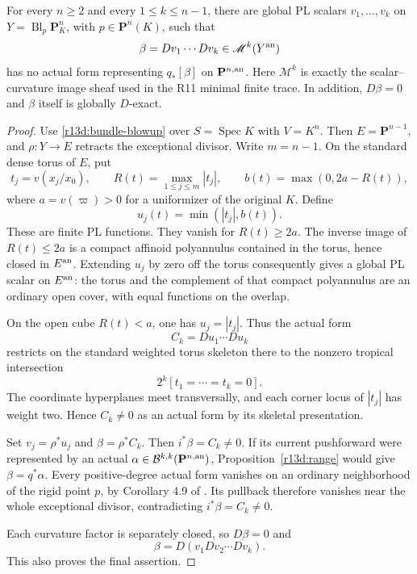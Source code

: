 \begin{theorem}
\label{r13d:counterexample}
For every $n\geq2$ and every $1\leq k\leq n-1$, there are global
PL scalars $v_1,\ldots,v_k$ on
$Y=\operatorname{Bl}_{p}\mathbf P^n_K$, with $p\in\mathbf P^n(K)$,
such that
\[
                      \beta=Dv_1\cdots Dv_k
                           \in\mathscr M^k(Y^{\rm an})
\]
has no actual form representing $q_*[\beta]$ on $\mathbf P^{n,\rm an}$.
Here $\mathscr M^k$ is exactly the scalar--curvature image sheaf
used in the R11 minimal finite trace.  In addition, $D\beta=0$ and
$\beta$ itself is globally $D$-exact.
\end{theorem}

\begin{proof}
Use \eqref{r13d:bundle-blowup} over $S=\operatorname{Spec}K$ with
$V=K^n$.  Then $E=\mathbf P^{n-1}$, and
$\rho:Y\to E$ retracts the exceptional divisor.  Write $m=n-1$.
On the standard dense torus of $E$, put
\[
 t_j=v(x_j/x_0),\qquad R(t)=\max_{1\leq j\leq m}|t_j|,
 \qquad b(t)=\max(0,2a-R(t)),
\]
where $a=v(\varpi)>0$ for a uniformizer of the original $K$.  Define
\[
                        u_j(t)=\min(|t_j|,b(t)).
\tag{R13.D13}\label{r13d:toric-potentials}
\]
These are finite PL functions.  They vanish for $R(t)\geq2a$.
The inverse image of $R(t)\leq2a$ is a compact affinoid polyannulus
contained in the torus, hence closed in $E^{\rm an}$.  Extending
$u_j$ by zero off the torus consequently gives a global PL scalar
on $E^{\rm an}$: the torus and the complement of that compact
polyannulus are an ordinary open cover, with equal functions on
the overlap.

On the open cube $R(t)<a$, one has $u_j=|t_j|$.  Thus the actual
form
\[
                              C_k=Du_1\cdots Du_k
\]
restricts on the standard weighted torus skeleton there to the
nonzero tropical intersection
\[
                         2^k[t_1=\cdots=t_k=0].
\]
The coordinate hyperplanes meet transversally, and each corner
locus of $|t_j|$ has weight two.  Hence $C_k\ne0$ as an actual
form by its skeletal presentation.

Set $v_j=\rho^*u_j$ and $\beta=\rho^*C_k$.
Then $i^*\beta=C_k\ne0$.  If its current pushforward were
represented by an actual $\alpha\in\mathcal B^{k,k}(\mathbf P^{n,\rm an})$,
Proposition~\ref{r13d:range} would give $\beta=q^*\alpha$.
Every positive-degree actual form vanishes on an ordinary
neighborhood of the rigid point $p$, by Corollary 4.9 of \cite{M}.
Its pullback therefore vanishes near the whole exceptional divisor,
contradicting $i^*\beta=C_k\ne0$.

Each curvature factor is separately closed, so $D\beta=0$ and
\[
                         \beta=D(v_1Dv_2\cdots Dv_k).
\]
This also proves the final assertion.
\end{proof}

